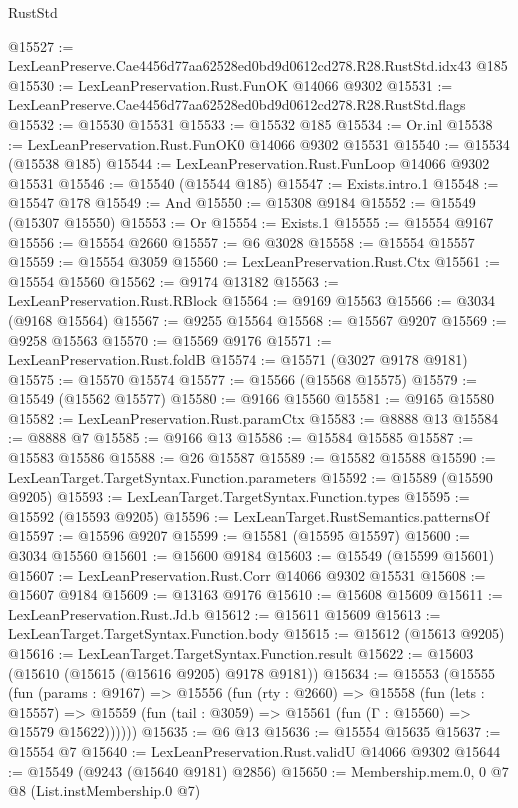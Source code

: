 \begin{lexlean}{RustStd}
\begin{coremodule}
@15527 := LexLeanPreserve.Cae4456d77aa62528ed0bd9d0612cd278.R28.RustStd.idx43 @185
@15530 := LexLeanPreservation.Rust.FunOK @14066 @9302
@15531 := LexLeanPreserve.Cae4456d77aa62528ed0bd9d0612cd278.R28.RustStd.flags
@15532 := @15530 @15531
@15533 := @15532 @185
@15534 := Or.inl
@15538 := LexLeanPreservation.Rust.FunOK0 @14066 @9302 @15531
@15540 := @15534 (@15538 @185)
@15544 := LexLeanPreservation.Rust.FunLoop @14066 @9302 @15531
@15546 := @15540 (@15544 @185)
@15547 := Exists.intro.{1}
@15548 := @15547 @178
@15549 := And
@15550 := @15308 @9184
@15552 := @15549 (@15307 @15550)
@15553 := Or
@15554 := Exists.{1}
@15555 := @15554 @9167
@15556 := @15554 @2660
@15557 := @6 @3028
@15558 := @15554 @15557
@15559 := @15554 @3059
@15560 := LexLeanPreservation.Rust.Ctx
@15561 := @15554 @15560
@15562 := @9174 @13182
@15563 := LexLeanPreservation.Rust.RBlock
@15564 := @9169 @15563
@15566 := @3034 (@9168 @15564)
@15567 := @9255 @15564
@15568 := @15567 @9207
@15569 := @9258 @15563
@15570 := @15569 @9176
@15571 := LexLeanPreservation.Rust.foldB
@15574 := @15571 (@3027 @9178 @9181)
@15575 := @15570 @15574
@15577 := @15566 (@15568 @15575)
@15579 := @15549 (@15562 @15577)
@15580 := @9166 @15560
@15581 := @9165 @15580
@15582 := LexLeanPreservation.Rust.paramCtx
@15583 := @8888 @13
@15584 := @8888 @7
@15585 := @9166 @13
@15586 := @15584 @15585
@15587 := @15583 @15586
@15588 := @26 @15587
@15589 := @15582 @15588
@15590 := LexLeanTarget.TargetSyntax.Function.parameters
@15592 := @15589 (@15590 @9205)
@15593 := LexLeanTarget.TargetSyntax.Function.types
@15595 := @15592 (@15593 @9205)
@15596 := LexLeanTarget.RustSemantics.patternsOf
@15597 := @15596 @9207
@15599 := @15581 (@15595 @15597)
@15600 := @3034 @15560
@15601 := @15600 @9184
@15603 := @15549 (@15599 @15601)
@15607 := LexLeanPreservation.Rust.Corr @14066 @9302 @15531
@15608 := @15607 @9184
@15609 := @13163 @9176
@15610 := @15608 @15609
@15611 := LexLeanPreservation.Rust.Jd.b
@15612 := @15611 @15609
@15613 := LexLeanTarget.TargetSyntax.Function.body
@15615 := @15612 (@15613 @9205)
@15616 := LexLeanTarget.TargetSyntax.Function.result
@15622 := @15603 (@15610 (@15615 (@15616 @9205) @9178 @9181))
@15634 := @15553
    (@15555
      (fun (params : @9167) =>
      @15556
        (fun (rty : @2660) =>
        @15558
          (fun (lets : @15557) =>
          @15559 (fun (tail : @3059) => @15561 (fun (Γ : @15560) => @15579 @15622))))))
@15635 := @6 @13
@15636 := @15554 @15635
@15637 := @15554 @7
@15640 := LexLeanPreservation.Rust.validU @14066 @9302
@15644 := @15549 (@9243 (@15640 @9181) @2856)
@15650 := Membership.mem.{0, 0} @7 @8 (List.instMembership.{0} @7)

\end{coremodule}
\end{lexlean}
